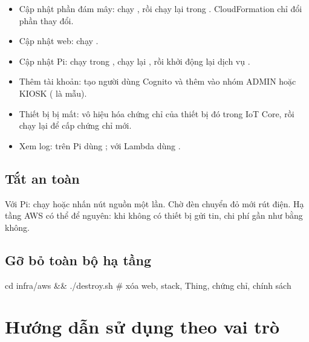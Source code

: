 \begin{itemize}
  \item Cập nhật phần đám mây: chạy , rồi chạy lại  trong . CloudFormation chỉ đổi phần thay đổi.
  \item Cập nhật web: chạy .
  \item Cập nhật Pi: chạy  trong , chạy lại , rồi khởi động lại dịch vụ .
  \item Thêm tài khoản: tạo người dùng Cognito và thêm vào nhóm ADMIN hoặc KIOSK ( là mẫu).
  \item Thiết bị bị mất: vô hiệu hóa chứng chỉ của thiết bị đó trong IoT Core, rồi chạy lại  để cấp chứng chỉ mới.
  \item Xem log: trên Pi dùng ; với Lambda dùng .
\end{itemize}

\subsection{Tắt an toàn}

Với Pi: chạy  hoặc nhấn nút nguồn một lần. Chờ đèn chuyển đỏ mới rút điện. Hạ tầng AWS có thể để nguyên: khi không có thiết bị gửi tin, chi phí gần như bằng không.

\subsection{Gỡ bỏ toàn bộ hạ tầng}\label{sec:gobo}

\begin{lenh}
cd infra/aws && ./destroy.sh   # xóa web, stack, Thing, chứng chỉ, chính sách
\end{lenh}

\section{Hướng dẫn sử dụng theo vai trò}\label{sec:huongdan}

